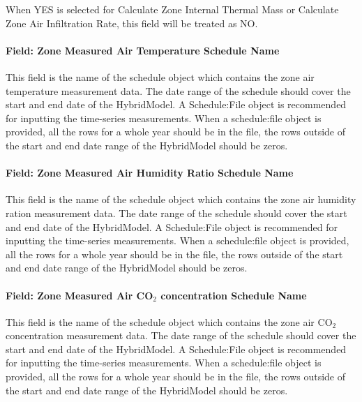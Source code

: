 When YES is selected for Calculate Zone Internal Thermal Mass or Calculate Zone Air Infiltration Rate, this field will be treated as NO.

\paragraph{Field: Zone Measured Air Temperature Schedule Name}\label{field-zone-measured-air-temperature-schedule-name-hm}

This field is the name of the schedule object which contains the zone air temperature measurement data. The date range of the schedule should cover the start and end date of the HybridModel. A Schedule:File object is recommended for inputting the time-series measurements. When a schedule:file object is provided, all the rows for a whole year should be in the file, the rows outside of the start and end date range of the HybridModel should be zeros.

\paragraph{Field: Zone Measured Air Humidity Ratio Schedule Name}\label{field-zone-measured-air-humidity-ratio-schedule-name-hm}

This field is the name of the schedule object which contains the zone air humidity ration measurement data. The date range of the schedule should cover the start and end date of the HybridModel. A Schedule:File object is recommended for inputting the time-series measurements. When a schedule:file object is provided, all the rows for a whole year should be in the file, the rows outside of the start and end date range of the HybridModel should be zeros.

\paragraph{Field: Zone Measured Air CO$_2$ concentration Schedule Name}\label{field-zone-measured-air-co2-concentration-schedule-name-hm}

This field is the name of the schedule object which contains the zone air CO$_2$ concentration measurement data. The date range of the schedule should cover the start and end date of the HybridModel. A Schedule:File object is recommended for inputting the time-series measurements. When a schedule:file object is provided, all the rows for a whole year should be in the file, the rows outside of the start and end date range of the HybridModel should be zeros.

